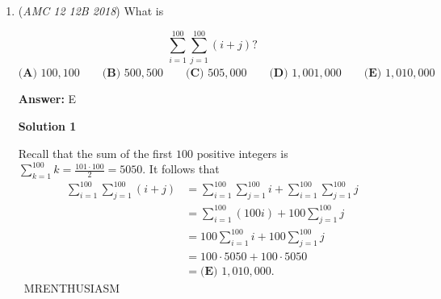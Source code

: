 \begin{enumerate}
\textbf{Solution 4}

Let the center of the circle be $O$. Since $AB$ is a diameter of length $24$, $OC$ is a median to $AB$ and a radius of the circle, so $OC = 12$. 

 Let the centroid of $\triangle ABC$ be $G$. By the Centroid Theorem, $G$ lies on the segment $OC$ such that the ratio of $OG$ to $GC$ is $1:2$. 

 Since $OG = \frac{1}{3} OC$, we have:
 \[OG = \frac{1}{3}(12) = 4\]

 As $C$ moves along the boundary of the circle, the centroid $G$ carves out a smaller, concentric circle of radius $4$. 

 The area of this region is:
 \[\text{Area} = \pi \cdot 4^2 = 16\pi \approx 50.27\]

 Rounding to the nearest whole number, the answer is $\boxed{50}$.

 



\textbf{Solution 5}

By barycentric coordinates, $G$ the centroid satisfies $G = \frac{a+b+c}{3}$ where $a,b,c$ are the position vectors of $A,B,C$ respectively. Then, by definition, let $a \langle 0,0 \rangle$ and $b \langle 24, 0 \rangle$. Then, $G = \langle 8,0 \rangle + \frac{c}{3}$. As $C$ lies on the circle, the vector value of $G$ is solely dependent on $\frac{c}{3}$. That is, as $C$ can lie on the circle, $\frac{c}{3}$ oscillates between $\langle 8,0 \rangle$ and $\langle 16,0 \rangle$, on the circle. Anywhere $C$ traverses, that value of $G$ is correspondent, hence if $C$ moves along the circle, then $G$ does as well along that interval. The requested path is then a circle concentric to circle $ABC$ whose radius is 4. That area is then $16 \cdot \pi \approx 16 \cdot 3 = 48$, so the nearest answer choice is $\boxed{50}$.

 


	\item (\textit{AMC 12 12B 2018}) What is

 \[\sum^{100}_{i=1} \sum^{100}_{j=1} (i+j) ?\]
$\textbf{(A) }100{,}100 \qquad \textbf{(B) }500{,}500\qquad \textbf{(C) }505{,}000 \qquad \textbf{(D) }1{,}001{,}000 \qquad \textbf{(E) }1{,}010{,}000 \qquad$

 \textbf{Answer: }E



\textbf{Solution 1}

Recall that the sum of the first $100$ positive integers is $\sum^{100}_{k=1} k = \frac{101\cdot100}{2}=5050.$ It follows that
 \begin{align*} \sum^{100}_{i=1} \sum^{100}_{j=1} (i+j) &= \sum^{100}_{i=1} \sum^{100}_{j=1}i + \sum^{100}_{i=1} \sum^{100}_{j=1}j \\ &= \sum^{100}_{i=1} (100i) + 100 \sum^{100}_{j=1}j \\ &= 100 \sum^{100}_{i=1}i + 100 \sum^{100}_{j=1}j \\ &= 100\cdot5050 + 100\cdot5050 \\ &= \boxed{\textbf{(E) }1{,}010{,}000}. \end{align*}
~MRENTHUSIASM


\end{enumerate}
